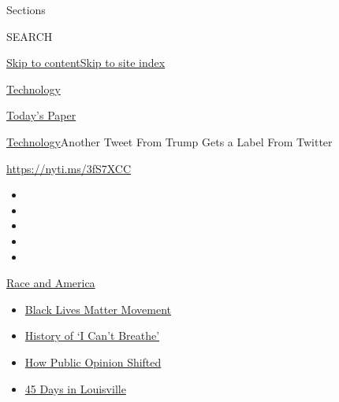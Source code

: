Sections

SEARCH

\protect\hyperlink{site-content}{Skip to
content}\protect\hyperlink{site-index}{Skip to site index}

\href{https://www.nytimes.com/section/technology}{Technology}

\href{https://myaccount.nytimes.com/auth/login?response_type=cookie\&client_id=vi}{}

\href{https://www.nytimes.com/section/todayspaper}{Today's Paper}

\href{/section/technology}{Technology}\textbar{}Another Tweet From Trump
Gets a Label From Twitter

\href{https://nyti.ms/3fS7XCC}{https://nyti.ms/3fS7XCC}

\begin{itemize}
\item
\item
\item
\item
\item
\end{itemize}

\href{https://www.nytimes.com/news-event/george-floyd-protests-minneapolis-new-york-los-angeles?action=click\&pgtype=Article\&state=default\&region=TOP_BANNER\&context=storylines_menu}{Race
and America}

\begin{itemize}
\tightlist
\item
  \href{https://www.nytimes.com/interactive/2020/07/03/us/george-floyd-protests-crowd-size.html?action=click\&pgtype=Article\&state=default\&region=TOP_BANNER\&context=storylines_menu}{Black
  Lives Matter Movement}
\item
  \href{https://www.nytimes.com/interactive/2020/06/28/us/i-cant-breathe-police-arrest.html?action=click\&pgtype=Article\&state=default\&region=TOP_BANNER\&context=storylines_menu}{History
  of `I Can't Breathe'}
\item
  \href{https://www.nytimes.com/interactive/2020/06/10/upshot/black-lives-matter-attitudes.html?action=click\&pgtype=Article\&state=default\&region=TOP_BANNER\&context=storylines_menu}{How
  Public Opinion Shifted}
\item
  \href{https://www.nytimes.com/interactive/2020/07/16/us/black-lives-matter-protests-louisville-breonna-taylor.html?action=click\&pgtype=Article\&state=default\&region=TOP_BANNER\&context=storylines_menu}{45
  Days in Louisville}
\end{itemize}

